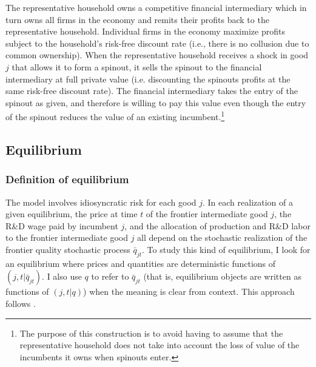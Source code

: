\documentclass[ecta,nameyear,final]{econsocart}
\theoremstyle{plain}
\theoremstyle{remark}
\begin{document}
The representative household owns a competitive financial intermediary which in turn owns all firms in the economy and remits their profits back to the representative household. Individual firms in the economy maximize profits subject to the household's risk-free discount rate (i.e., there is no collusion due to common ownership). When the representative household receives a shock in good $j$ that allows it to form a spinout, it sells the spinout to the financial intermediary at full private value (i.e. discounting the spinouts profits at the same risk-free discount rate). The financial intermediary takes the entry of the spinout as given, and therefore is willing to pay this value even though the entry of the spinout reduces the value of an existing incumbent.\footnote{The purpose of this construction is to avoid having to assume that the representative household does not take into account the loss of value of the incumbents it owns when spinouts enter.}


\subsection{Equilibrium}\label{subsec:decentralized_equilibrium}

\subsubsection{Definition of equilibrium}

The model involves idiosyncratic risk for each good $j$. In each realization of a given equilibrium, the price at time $t$ of the frontier intermediate good $j$, the R\&D wage paid by incumbent $j$, and the allocation of production and R\&D labor to the frontier intermediate good $j$ all depend on the stochastic realization of the frontier quality stochastic process $\bar{q}_{jt}$. To study this kind of equilibrium, I look for an equilibrium where prices and quantities are deterministic functions of $(j,t|\bar{q}_{jt})$. I also use $q$ to refer to $\bar{q}_{jt}$ (that is, equilibrium objects are written as functions of $(j,t|q)$) when the meaning is clear from context. This approach follows \cite{acemoglu_introduction_2009}. 
\end{document}
